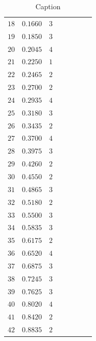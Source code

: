 \documentclass[12pt, a4paper]{article}
\begin{document}
\begin{table}[!htb]
{\begin{tabular}{|c|c|c|c|c|c|c|c|}
    \footnotesize $18 $& \footnotesize$0.1660$& $3$& &&&&\\
    \footnotesize $19 $& \footnotesize$0.1850$& $3$& &&&&\\
    \footnotesize $20 $& \footnotesize$0.2045$& $4$& &&&&\\
    \footnotesize $21 $&\footnotesize $0.2250$& $1$& &&&&\\
    \footnotesize $22 $& \footnotesize$0.2465$& $2$& &&&&\\
    \footnotesize $23 $& \footnotesize$0.2700$& $2$& &&&&\\
    \footnotesize $24 $& \footnotesize$0.2935$& $4$& &&&&\\
    \footnotesize $25 $& \footnotesize$0.3180$& $3$& &&&&\\
    \footnotesize $26 $& \footnotesize$0.3435$& $2$& &&&&\\
    \footnotesize $27 $& \footnotesize$0.3700$& $4$& &&&&\\
    \footnotesize $28 $& \footnotesize$0.3975$& $3$& &&&&\\
    \footnotesize $29 $& \footnotesize$0.4260$& $2$& &&&&\\
    \footnotesize $30 $& \footnotesize$0.4550$& $2$& &&&&\\ 
    \footnotesize $31 $& \footnotesize$0.4865$& $3$& &&&&\\
    \footnotesize $32 $& \footnotesize$0.5180$& $2$& &&&&\\
    \footnotesize $33 $& \footnotesize$0.5500$& $3$& &&&&\\
    \footnotesize $34 $& \footnotesize$0.5835$& $3$& &&&&\\
    \footnotesize $35 $& \footnotesize$0.6175$& $2$& &&&&\\
    \footnotesize $36 $& \footnotesize$0.6520$& $4$& &&&&\\
    \footnotesize $37 $& \footnotesize$0.6875$& $3$& &&&&\\
    \footnotesize $38 $& \footnotesize$0.7245$& $3$& &&&&\\
    \footnotesize $39 $& \footnotesize$0.7625$& $3$& &&&&\\
    \footnotesize $40 $& \footnotesize$0.8020$& $4$& &&&&\\
    \footnotesize $41 $&\footnotesize $0.8420$& $2$& &&&&\\
    \footnotesize $42$&\footnotesize $0.8835$ & $2$& &&&&\\
\hline
\end{tabular}}
  \caption{Caption}
  \label{Tabella Completa}
\end{table}
\end{document}
